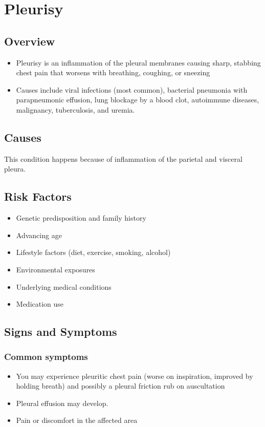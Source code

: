 \chapter{Pleurisy}
\label{sec:Pleurisy}

\section{Overview}


\begin{itemize}[noitemsep]
  \item Pleurisy is an inflammation of the pleural membranes causing sharp, stabbing chest pain that worsens with breathing, coughing, or sneezing
  \item Causes include viral infections (most common), bacterial pneumonia with parapneumonic effusion, lung blockage by a blood clot, autoimmune diseases, malignancy, tuberculosis, and uremia.
\end{itemize}
\section{Causes}
This condition happens because of inflammation of the parietal and visceral pleura.     
\section{Risk Factors}

\begin{itemize}[noitemsep]
  \item Genetic predisposition and family history
  \item Advancing age
  \item Lifestyle factors (diet, exercise, smoking, alcohol)
  \item Environmental exposures
  \item Underlying medical conditions
  \item Medication use
\end{itemize}
\section{Signs and Symptoms}

\subsection{Common symptoms}
\begin{itemize}[noitemsep]
  \item You may experience pleuritic chest pain (worse on inspiration, improved by holding breath) and possibly a pleural friction rub on auscultation
  \item Pleural effusion may develop.
  \item Pain or discomfort in the affected area
  \end{itemize}

